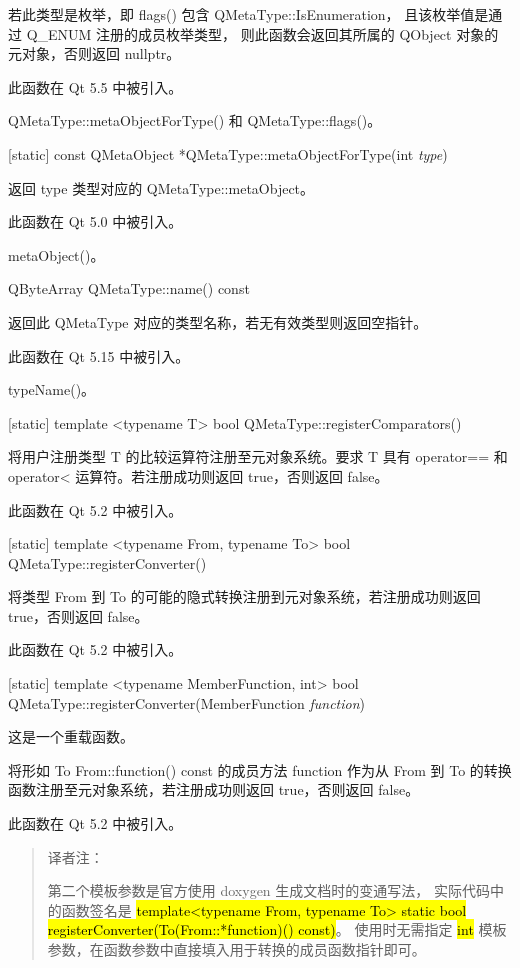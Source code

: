 若此类型是枚举，即 flags() 包含 QMetaType::IsEnumeration，
且该枚举值是通过 Q\_ENUM 注册的成员枚举类型，
则此函数会返回其所属的 QObject 对象的元对象，否则返回 nullptr。

此函数在 Qt 5.5 中被引入。

\begin{seeAlso}
QMetaType::metaObjectForType() 和 QMetaType::flags()。
\end{seeAlso}

[static] const QMetaObject *QMetaType::metaObjectForType(int \emph{type})

返回 type 类型对应的 QMetaType::metaObject。

此函数在 Qt 5.0 中被引入。

\begin{seeAlso}
metaObject()。
\end{seeAlso}

QByteArray QMetaType::name() const

返回此 QMetaType 对应的类型名称，若无有效类型则返回空指针。

此函数在 Qt 5.15 中被引入。

\begin{seeAlso}
typeName()。
\end{seeAlso}

[static] template <typename T> bool QMetaType::registerComparators()

将用户注册类型 T 的比较运算符注册至元对象系统。要求 T 具有 operator== 和 operator< 运算符。若注册成功则返回 true，否则返回 false。

此函数在 Qt 5.2 中被引入。

[static] template <typename From, typename To> bool QMetaType::registerConverter()

将类型 From 到 To 的可能的隐式转换注册到元对象系统，若注册成功则返回 true，否则返回 false。

此函数在 Qt 5.2 中被引入。

[static] template <typename MemberFunction, int> bool QMetaType::registerConverter(MemberFunction \emph{function})

这是一个重载函数。

将形如 To From::function() const 的成员方法 function 作为从 From 到 To 的转换函数注册至元对象系统，若注册成功则返回 true，否则返回 false。

此函数在 Qt 5.2 中被引入。

\begin{quote}
译者注：

第二个模板参数是官方使用 doxygen 生成文档时的变通写法，
实际代码中的函数签名是 \hl{template<typename From, typename To> static bool registerConverter(To(From::*function)() const)}。
使用时无需指定 \hl{int} 模板参数，在函数参数中直接填入用于转换的成员函数指针即可。
\end{quote}

